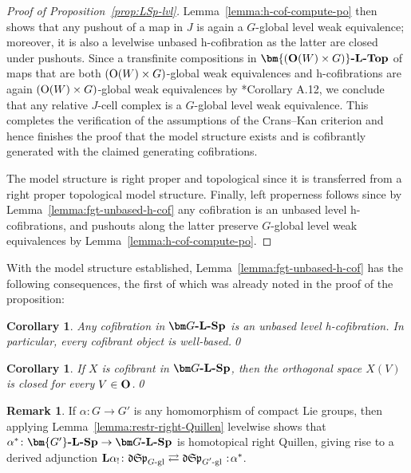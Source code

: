 \documentclass[reqno]{memo-l}
\theoremstyle{mythm}
\newtheorem{cor}[thm]{Corollary}
\theoremstyle{definition}
\newtheorem{rk}[thm]{Remark}
\numberwithin{equation}{section}
\newcommand{\cat}[1]{\textbf{\textup{#1}}}
\renewcommand{\O}{{\textup{O}}}
\newcommand\noloc{%
	\nobreak
	\mspace{6mu plus 1mu}
	{:}
	\nonscript\mkern-\thinmuskip
	\mathpunct{}
	\mspace{2mu}
}
\newcommand{\mySp}{{\mathfrak S\kern-.5pt\mathfrak p}}
\newcommand{\myLSp}{{\mathfrak d\kern-.25pt}\mySp}
\begin{document}
\begin{proof}[Proof of Proposition~\ref{prop:LSp-lvl}]
    Lemma~\ref{lemma:h-cof-compute-po} then shows that any pushout of a map in $J$ is again a $G$-global level weak equivalence; moreover, it is also a levelwise unbased h-cofibration as the latter are closed under pushouts. Since a transfinite compositions in $\cat{$\bm{(\O(W)\times G)}$-$\cat{L}$-Top}$ of maps that are both $(\O(W)\times G)$-global weak equivalences and h-cofibrations are again $(\O(W)\times G)$-global weak equivalences by \cite{barrero2021}*{Corollary A.12}, we conclude that any relative $J$-cell complex is a $G$-global level weak equivalence. This completes the verification of the assumptions of the Crans--Kan criterion and hence finishes the proof that the model structure exists and is cofibrantly generated with the claimed generating cofibrations.
    
    The model structure is right proper and topological since it is transferred from a right proper topological model structure. Finally, left properness follows since by Lemma~\ref{lemma:fgt-unbased-h-cof} any cofibration is an unbased level h-cofibrations, and pushouts along the latter preserve $G$-global level weak equivalences by Lemma~\ref{lemma:h-cof-compute-po}.
\end{proof}

With the model structure established, Lemma~\ref{lemma:fgt-unbased-h-cof} has the following consequences, the first of which was already noted in the proof of the proposition:

\begin{cor}\label{cor:SpL-level-hcof}
    Any cofibration in $\cat{$\bm G$-${\cat L}$-Sp}$ is an unbased level h-cofibration. In particular, every cofibrant object is well-based.\qed
\end{cor}

\begin{cor}\label{cor:cofibrant-LSp-closed}
    If $X$ is cofibrant in $\cat{$\bm G$-$\cat{L}$-Sp}$, then the orthogonal space $X(V)$ is closed for every $V\in\cat{O}$.\qed
\end{cor}

\begin{rk}\label{rk:LSp-Lf!}
    If $\alpha\colon G\to G'$ is any homomorphism of compact Lie groups, then applying Lemma~\ref{lemma:restr-right-Quillen} levelwise shows that $\alpha^*\colon\cat{$\bm{G'}$-$\cat{L}$-Sp}\to\cat{$\bm G$-$\cat{L}$-Sp}$ is homotopical right Quillen, giving rise to a derived adjunction $\cat{L}\alpha_!\colon\myLSp_\text{$G$-gl}\rightleftarrows\myLSp_\text{$G'$-gl}\noloc \alpha^*$.
\end{rk}
\end{document}
